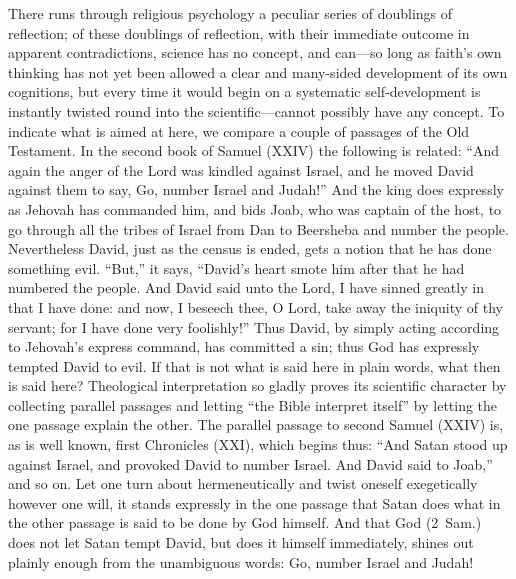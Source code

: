 \documentclass[12pt]{book}
\newcommand{\opage}[1]{\marginnote{\footnotesize\textit{[#1]}}}
\begin{document}
There runs through religious psychology a peculiar series of doublings
of reflection; of these doublings of reflection, with their immediate
outcome in apparent contradictions, science has no concept, and
can---so long as faith's own thinking has not yet been allowed a clear
and many-sided development of its own cognitions, but every time it
would begin on a systematic self-development is instantly twisted round
into the scientific---cannot possibly have any concept. To indicate what
is aimed at here, we compare a couple of passages of the Old Testament.
In the second book of Samuel (XXIV) the following is related: ``And
again the anger of the Lord was kindled against Israel, and he moved
David against them to say, Go, number Israel and Judah!'' And the king
does expressly as Jehovah has commanded him, and bids Joab, who was
captain of the host, to go through all the tribes of Israel from Dan to
Beersheba and number the people. Nevertheless David, just as the census
is ended, gets a notion that he has done something evil. ``But,'' it
says, ``David's heart smote him after that he had numbered the people.
And David said unto the Lord, I have sinned greatly in that I have done:
and now, I beseech thee, O Lord, take away the iniquity of thy servant;
for I have done very foolishly!'' Thus David, by simply acting according
to Jehovah's express command, has committed a sin; thus God has
expressly tempted David to evil. If that is not what is said here in
plain words, what then is said here? Theological interpretation so
gladly proves its scientific character by collecting parallel passages
and letting ``the Bible interpret itself'' by letting the one passage
explain the other. The parallel passage to second Samuel (XXIV) is, as
is well known, first
\opage{87}\setcounter{footnote}{0}%
Chronicles (XXI), which begins thus: ``And Satan stood up against
Israel, and provoked David to number Israel. And David said to Joab,''
and so on. Let one turn about hermeneutically and twist oneself
exegetically however one will, it stands expressly in the one passage
that Satan does what in the other passage is said to be done by God
himself. And that God (2~Sam.) does not let Satan tempt David, but does
it himself immediately, shines out plainly enough from the unambiguous
words: Go, number Israel and Judah!
\end{document}
